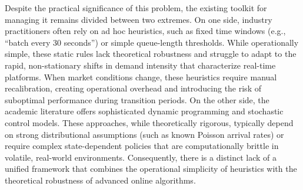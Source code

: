 Despite the practical significance of this problem, the existing toolkit for managing it remains divided between two extremes.
On one side, industry practitioners often rely on ad hoc heuristics, such as fixed time windows (e.g., ``batch every 30 seconds'') or simple queue-length thresholds.
While operationally simple, these static rules lack theoretical robustness and struggle to adapt to the rapid, non-stationary shifts in demand intensity that characterize real-time platforms.
When market conditions change, these heuristics require manual recalibration, creating operational overhead and introducing the risk of suboptimal performance during transition periods.
On the other side, the academic literature offers sophisticated dynamic programming and stochastic control models.
These approaches, while theoretically rigorous, typically depend on strong distributional assumptions (such as known Poisson arrival rates) or require complex state-dependent policies that are computationally brittle in volatile, real-world environments.
Consequently, there is a distinct lack of a unified framework that combines the operational simplicity of heuristics with the theoretical robustness of advanced online algorithms.

